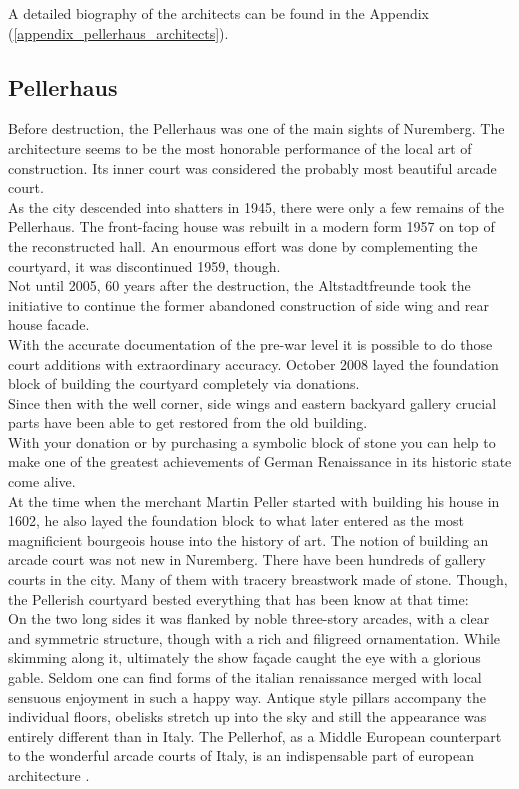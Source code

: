A detailed biography of the architects can be found in the Appendix (\ref{appendix_pellerhaus_architects}).

\subsection{Pellerhaus}

Before destruction, the Pellerhaus was one of the main sights of Nuremberg. The architecture seems to be the most honorable performance of the local art of construction. Its inner court was considered the probably most beautiful arcade court.\\
As the city descended into shatters in 1945, there were only a few remains of the Pellerhaus. The front-facing house was rebuilt in a modern form 1957 on top of the reconstructed hall. An enourmous effort was done by complementing the courtyard, it was discontinued 1959, though.\\
Not until 2005, 60 years after the destruction, the Altstadtfreunde took the initiative to continue the former abandoned construction of side wing and rear house facade.\\
With the accurate documentation of the pre-war level it is possible to do those court additions with extraordinary accuracy. October 2008 layed the foundation block of building the courtyard completely via donations.\\
Since then with the well corner, side wings and eastern backyard gallery crucial parts have been able to get restored from the old building.\\
With your donation or by purchasing a symbolic block of stone you can help to make one of the greatest achievements of German Renaissance in its historic state come alive.\\
At the time when the merchant Martin Peller started with building his house in 1602, he also layed the foundation block to what later entered as the most magnificient bourgeois house into the history of art. The notion of building an arcade court was not new in Nuremberg. There have been hundreds of gallery courts in the city. Many of them with tracery breastwork made of stone. Though, the Pellerish courtyard bested everything that has been know at that time:\\
On the two long sides it was flanked by noble three-story arcades, with a clear and symmetric structure, though with a rich and filigreed ornamentation. While skimming along it, ultimately the show façade caught the eye with a glorious gable. Seldom one can find forms of the italian renaissance merged with local sensuous enjoyment in such a happy way. Antique style pillars accompany the individual floors, obelisks stretch up into the sky and still the appearance was entirely different than in Italy. The Pellerhof, as a Middle European counterpart to the wonderful arcade courts of Italy, is an indispensable part of european architecture \parencite[translated from German]{afWiederaufbauDesPellerhofes}.\\



